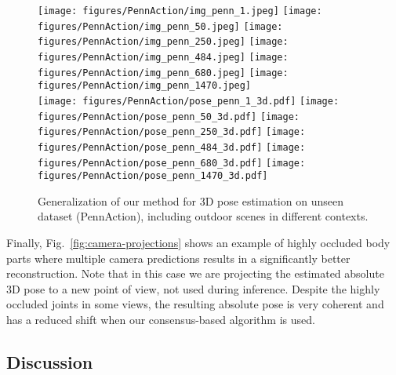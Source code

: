 \documentclass[10pt,twocolumn,letterpaper]{article}
\newcommand{\revb}[1]{{#1}}
\begin{document}
\begin{figure*}[!h]
  \centering
  \texttt{[image: figures/PennAction/img\_penn\_1.jpeg]}\hspace{0.2cm}
  \texttt{[image: figures/PennAction/img\_penn\_50.jpeg]}\hspace{0.2cm}
  \texttt{[image: figures/PennAction/img\_penn\_250.jpeg]}\hspace{0.2cm}
  \texttt{[image: figures/PennAction/img\_penn\_484.jpeg]}\hspace{0.2cm}
  \texttt{[image: figures/PennAction/img\_penn\_680.jpeg]}\hspace{0.2cm}
  \texttt{[image: figures/PennAction/img\_penn\_1470.jpeg]}\\\vspace{0.2cm}
  \texttt{[image: figures/PennAction/pose\_penn\_1\_3d.pdf]}
  \texttt{[image: figures/PennAction/pose\_penn\_50\_3d.pdf]}
  \texttt{[image: figures/PennAction/pose\_penn\_250\_3d.pdf]}
  \texttt{[image: figures/PennAction/pose\_penn\_484\_3d.pdf]}
  \texttt{[image: figures/PennAction/pose\_penn\_680\_3d.pdf]}
  \texttt{[image: figures/PennAction/pose\_penn\_1470\_3d.pdf]}
  \caption{
    Generalization of our method for 3D pose estimation on unseen dataset (PennAction), including outdoor scenes in different contexts.
  }
  \label{fig:predictions_pennaction}
\end{figure*}



\revb{Finally}, Fig.~\ref{fig:camera-projections} shows an example of highly
occluded body parts where multiple camera predictions results in a
significantly better reconstruction. Note that in this case we are projecting
the estimated absolute 3D pose to a new point of view, not used during
inference. Despite the highly occluded joints in some views, the resulting
absolute pose is very coherent and has a reduced shift when our consensus-based
algorithm is used.



\subsection{\revb{Discussion}}
\end{document}
